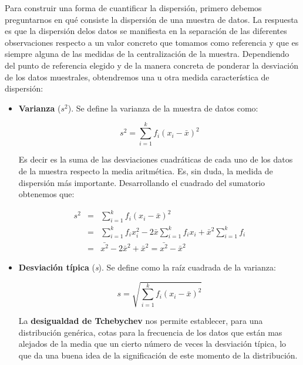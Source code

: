 \documentclass[12pt,a4paper]{book}
\begin{document}
Para construir una forma de cuantificar la dispersión, primero debemos preguntarnos en qué consiste la dispersión de una muestra de datos. La respuesta es que la dispersión delos datos se manifiesta en la separación de las diferentes observaciones respecto a un valor concreto que tomamos como referencia y que es siempre alguna de las medidas de la centralización de la muestra. Dependiendo del punto de referencia elegido y de la manera concreta de ponderar la desviación de los datos muestrales, obtendremos una u otra medida característica de dispersión:

\begin{itemize}
\item \textbf{Varianza} ($s^2$). Se define la varianza de la muestra de datos como:

\begin{equation}
s^2 = \sum_{i=1}^k f_i (x_i-\bar{x})^2
\end{equation}


Es decir es la suma de las desviaciones cuadráticas de cada uno de los datos de la muestra respecto la media aritmética. Es, sin duda, la medida de dispersión más importante. Desarrollando el cuadrado del sumatorio obtenemos que:

\begin{eqnarray}
s^2 & = & \sum_{i=1}^k f_i (x_i-\bar{x})^2 \nonumber\\
    & = & \sum_{i=1}^k f_i x_i^2 - 2 \bar{x} \sum_{i=1}^k f_i x_i + \bar{x}^2 \sum_{i=1}^k f_i \nonumber\\
    & = & \bar{x^2}  - 2\bar{x}^2 + \bar{x}^2 = \bar{x^2}  - \bar{x}^2
\end{eqnarray}


\item \textbf{Desviación típica} (\textit{s}). Se define como la raíz cuadrada de la varianza:

\begin{equation}
s = \sqrt{\sum_{i=1}^k f_i (x_i - \bar{x})^2}
\end{equation}

La \textbf{desigualdad de Tchebychev} nos permite establecer, para una distribución genérica, cotas para la frecuencia de los datos que están mas alejados de la media que un cierto número de veces la desviación típica, lo que da una buena idea de la significación de  este momento de la distribución. \\


\textcolor{negro}{\fboxrule=0.5pt \fboxsep=6pt } \\ \\



\end{itemize}
\end{document}
